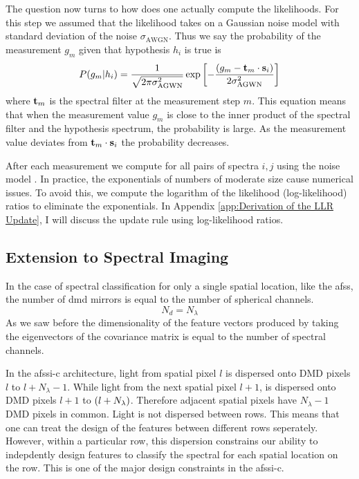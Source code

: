 The question now turns to how does one actually compute the likelihoods. For this step we assumed that the likelihood takes on a Gaussian noise model with standard deviation of the noise $\sigma_{\text{AWGN}}$. Thus we say the probability of the measurement $g_m$ given that hypothesis $h_i$ is true is 
%
\begin{equation}
	\prob{g_m | h_i } = \frac{1}{\sqrt{2\pi\sigma_{\text{AGWN}}^2 }} 
	\exp \left[ - \frac{ \ap{g_m - \mb{t}_m \cdot \mb{s}_i } }{2 \sigma_{\text{AGWN} }^2} \right]
	\label{eq:noiseModel1}
\end{equation}
%
where $\mathbf{t}_m$ is the spectral filter at the measurement step $m$. This equation means that when the measurement value $g_m$ is close to the inner product of the spectral filter and the hypothesis spectrum, the probability is large. As the measurement value deviates from $\mathbf{t}_m \cdot \mathbf{s}_i $ the probability decreases.

After each measurement we compute  for all pairs of spectra ${i,j}$ using the noise model . In practice, the exponentials of numbers of moderate size cause numerical issues. To avoid this, we compute the logarithm of the likelihood (log-likelihood) ratios to eliminate the exponentials. In Appendix \ref{app:Derivation of the LLR Update}, I will discuss the update rule using log-likelihood ratios. 

\subsection{Extension to Spectral Imaging}

In the case of spectral classification for only a single spatial location, like the \gls{afss}, the number of \gls{dmd} mirrors is equal to the number of spherical channels. 
%
\begin{equation}
	N_d = N_{\lambda} 
\end{equation}
%
As we saw before the dimensionality of the feature vectors produced by taking the eigenvectors of the covariance matrix is equal to the number of spectral channels. 

In the \gls{afssi-c} architecture, light from spatial pixel $l$ is dispersed onto DMD pixels $l$ to $l + N_{\lambda} - 1$. While light from the next spatial pixel $l + 1$, is dispersed onto DMD pixels $l + 1$ to $ \ap{l + N_{\lambda}} $. Therefore adjacent spatial pixels have $N_{\lambda} - 1$ DMD pixels in common. Light is not dispersed between rows. This means that one can treat the design of the features between different rows seperately. However, within a particular row, this dispersion constrains our ability to indepdently design features to classify the spectral for each spatial location on the row. This is one of the major design constraints in the \gls{afssi-c}. 


